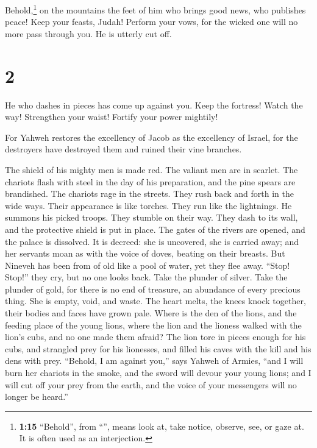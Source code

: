  Behold,\footnote{\textbf{1:15} ``Behold'', from
  ``'', means look at, take notice, observe, see, or gaze
  at. It is often used as an interjection.} on the mountains the feet of
him who brings good news, who publishes peace! Keep your feasts, Judah!
Perform your vows, for the wicked one will no more pass through you. He
is utterly cut off.

\hypertarget{section-1}{%
\section{2}\label{section-1}}

 He who dashes in pieces has come up against you. Keep the
fortress! Watch the way! Strengthen your waist! Fortify your power
mightily!

 For Yahweh restores the excellency of Jacob as the
excellency of Israel, for the destroyers have destroyed them and ruined
their vine branches.

 The shield of his mighty men is made red. The valiant men
are in scarlet. The chariots flash with steel in the day of his
preparation, and the pine spears are brandished.  The
chariots rage in the streets. They rush back and forth in the wide ways.
Their appearance is like torches. They run like the lightnings.
 He summons his picked troops. They stumble on their way.
They dash to its wall, and the protective shield is put in place.
 The gates of the rivers are opened, and the palace is
dissolved.  It is decreed: she is uncovered, she is
carried away; and her servants moan as with the voice of doves, beating
on their breasts.  But Nineveh has been from of old like a
pool of water, yet they flee away. ``Stop! Stop!'' they cry, but no one
looks back.  Take the plunder of silver. Take the plunder
of gold, for there is no end of treasure, an abundance of every precious
thing.  She is empty, void, and waste. The heart melts,
the knees knock together, their bodies and faces have grown pale.
 Where is the den of the lions, and the feeding place of
the young lions, where the lion and the lioness walked with the lion's
cubs, and no one made them afraid?  The lion tore in
pieces enough for his cubs, and strangled prey for his lionesses, and
filled his caves with the kill and his dens with prey. 
``Behold, I am against you,'' says Yahweh of Armies, ``and I will burn
her chariots in the smoke, and the sword will devour your young lions;
and I will cut off your prey from the earth, and the voice of your
messengers will no longer be heard.''

